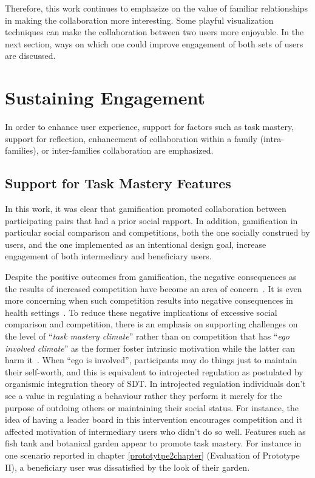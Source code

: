 Therefore, this work continues to emphasize on the value of familiar relationships in making the collaboration more interesting. Some playful visualization techniques can make the collaboration between two users more enjoyable. In the next section, ways on which one could improve engagement of both sets of users are discussed.

\section{Sustaining Engagement}
In order to enhance user experience, support for factors such as task mastery, support for reflection, enhancement of collaboration within a family (intra-families), or inter-families collaboration are emphasized.
\subsection{Support for Task Mastery Features}
In this work, it was clear that gamification promoted collaboration between participating pairs that had a prior social rapport. In addition, gamification in particular social comparison and competitions, both the one socially construed by users, and the one implemented as an intentional design goal,   increase engagement of both intermediary and beneficiary users.

Despite the positive outcomes from gamification, the negative consequences as the results of increased competition have become an area of concern~\citep{jia2016personality}. It is even more concerning when such competition results into negative consequences in health settings~\citep{grimes2009toward}. To reduce these negative implications of excessive social comparison and competition, there is an emphasis on supporting challenges on the level of ``\emph{task mastery climate}'' rather than on competition that has ``\emph{ego involved climate}'' as the  former foster intrinsic motivation while the latter can harm it~\citep{saksono2015spaceship}. When ``ego is involved'', participants may do things just to maintain their self-worth, and this is equivalent to introjected regulation as postulated by organismic integration theory of SDT\citep{ryan2000:self}. In introjected regulation individuals don't see a value in regulating a behaviour rather they perform it merely for the purpose of outdoing others or maintaining their social status. For instance, the idea of having a leader board in this intervention encourages competition and it affected motivation of intermediary users who didn't do so well. Features such as fish tank and botanical garden appear to promote task mastery. For instance in one scenario reported in chapter \ref{prototytpe2chapter} (Evaluation of Prototype II),  a beneficiary user was dissatisfied by the look of their garden.


